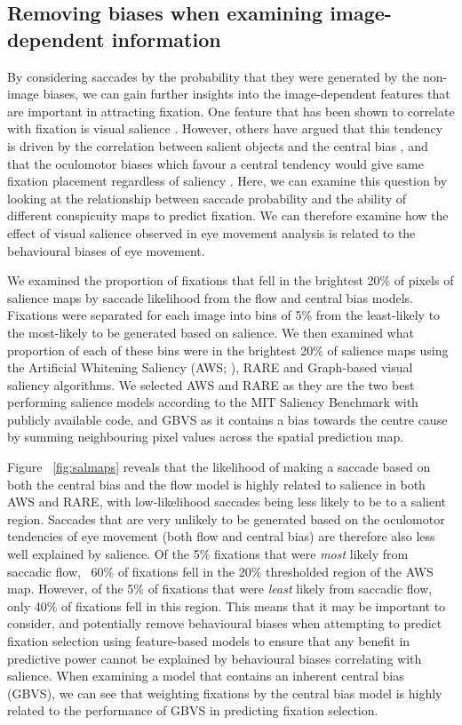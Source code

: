 \subsection{Removing biases when examining image-dependent information}

By considering saccades by the probability that they were generated by the non-image biases, we can gain further insights into the image-dependent features that are important in attracting fixation. One feature that has been shown to correlate with fixation is visual salience \citep{parkhurst2002}. However, others have argued that this tendency is driven by the correlation between salient objects and the central bias \citep{XXHendersonXX}, and that the oculomotor biases which favour a central tendency would give same fixation placement regardless of saliency \citep{tatler-vincent2009}. Here, we can examine this question by looking at the relationship between saccade probability and the ability of different conspicuity maps to predict fixation. We can therefore examine how the effect of visual salience observed in eye movement analysis is related to the behavioural biases of eye movement.

We examined the proportion of fixations that fell in the brightest 20\% of pixels of salience maps by saccade likelihood from the flow and central bias models. Fixations were separated for each image into bins of 5\% from the least-likely to the most-likely to be generated based on salience. We then examined what proportion of each of these bins were in the brightest 20\% of salience maps using the Artificial Whitening Saliency (AWS; \cite{garciadiaz2012}), RARE \citep{riche2013} and Graph-based visual saliency \citep[GBVS;][]{harel2006} algorithms. We selected AWS and RARE as they are the two best performing salience models according to the MIT Saliency Benchmark \citep{mit-saliency-benchmark,judd2012} with publicly available code, and GBVS as it contains a bias towards the centre cause by summing neighbouring pixel values across the spatial prediction map.

Figure ~\ref{fig:salmaps} reveals that the likelihood of making a saccade based on both the central bias and the flow model is highly related to salience in both AWS and RARE, with low-likelihood saccades being less likely to be to a salient region. Saccades that are very unlikely to be generated based on the oculomotor tendencies of eye movement (both flow and central bias) are therefore also less well explained by salience. Of the 5\% fixations that were \textit{most} likely from saccadic flow, ~60\% of fixations fell in the 20\% thresholded region of the AWS map. However, of the 5\% of fixations that were \textit{least} likely from saccadic flow, only 40\% of fixations fell in this region. This means that it may be important to consider, and potentially remove behavioural biases when attempting to predict fixation selection using feature-based models to ensure that any benefit in predictive power cannot be explained by behavioural biases correlating with salience. When examining a model that contains an inherent central bias (GBVS), we can see that weighting fixations by the \citet{clarke-tatler2014} central bias model is highly related to the performance of GBVS in predicting fixation selection.

